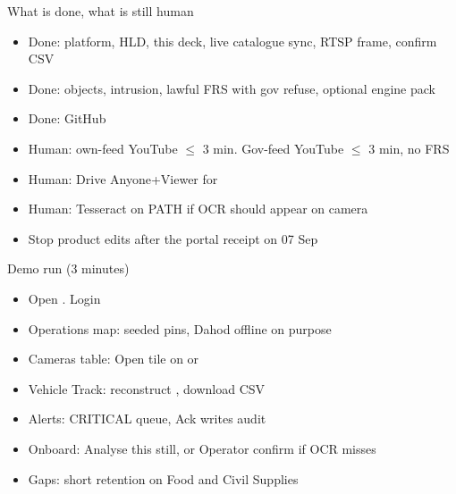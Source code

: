 \documentclass[aspectratio=169,11pt]{beamer}
\begin{document}
\begin{frame}{What is done, what is still human}
\begin{itemize}\itemsep0.5em
\item Done: platform, HLD, this deck, live catalogue sync, RTSP frame, confirm CSV
\item Done: objects, intrusion, lawful FRS with gov refuse, optional engine pack
\item Done: GitHub 
\item Human: own-feed YouTube $\le$ 3 min. Gov-feed YouTube $\le$ 3 min, no FRS
\item Human: Drive Anyone+Viewer for 
\item Human: Tesseract on PATH if OCR should appear on camera
\item Stop product edits after the portal receipt on 07 Sep
\end{itemize}
\end{frame}

\begin{frame}{Demo run (3 minutes)}
\begin{itemize}\itemsep0.5em
\item Open . Login 
\item Operations map: seeded pins, Dahod offline on purpose
\item Cameras table: Open tile on  or 
\item Vehicle Track: reconstruct , download CSV
\item Alerts: CRITICAL queue, Ack writes audit
\item Onboard: Analyse this still, or Operator confirm if OCR misses
\item Gaps: short retention on Food and Civil Supplies
\end{itemize}
\end{frame}
\end{document}
